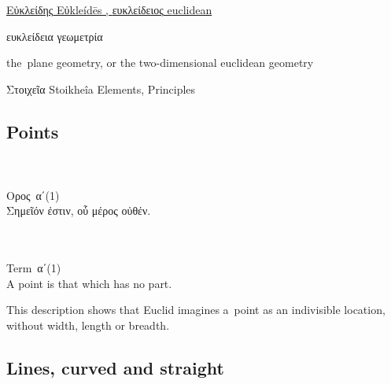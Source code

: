 \href{https://el.wikipedia.org/wiki/%CE%95%CF%85%CE%BA%CE%BB%CE%B5%CE%AF%CE%B4%CE%B7%CF%82}{%
\textgreek{Εὐκλείδης}
Eὐkleídēs
,
\textgreek{ευκλείδειος}
euclidean %
}

\textgreek{ευκλείδεια γεωμετρία}

the~plane geometry, or the two\hbox{-}dimensional euclidean geometry

\textgreek{Στοιχεῖα}
Stoikheîa
Elements, Principles

\vspace{.5em}

\subsection{Points}

{\small
\setlength{\parindent}{0pt}

\nopagebreak%
\begin{multicols}{2}
%
\\
\\[.3em]
\textgreek{Ορος}~\textgreek{α΄}\:(1)\\[.1em]
\textgreek{Σημεῖόν ἐστιν, οὗ μέρος οὐθέν.}

\columnbreak
%
\\
\\[.3em]
Term~\textgreek{α΄}\:(1)\\[.1em]
A point is that which has no part.
%
\end{multicols}
\par}

This description
shows that
Euclid imagines a~point
as
an indivisible location,
without width,
length
or
breadth.

\subsection{Lines, curved and straight}

